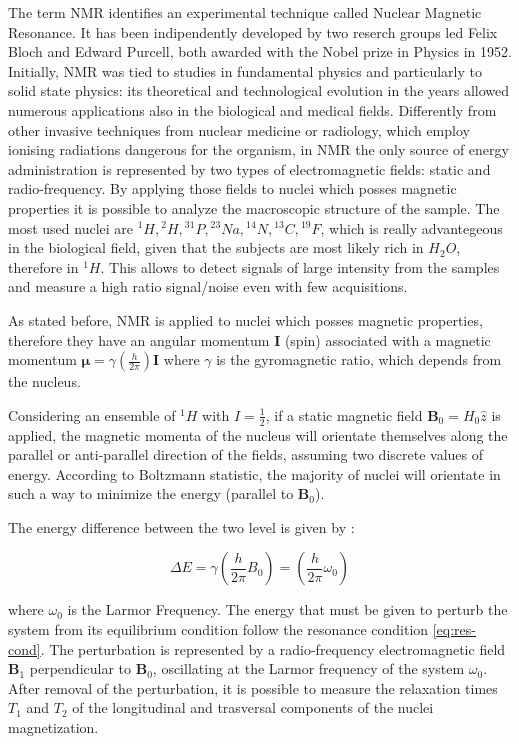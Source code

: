 \documentclass[12pt,a4paper]{report}
\begin{document}
The term NMR identifies an experimental technique called Nuclear Magnetic Resonance.
It has been indipendently developed by two reserch groups led Felix Bloch and Edward Purcell, both awarded with the Nobel prize in Physics in 1952. 
Initially, NMR was tied to studies in fundamental physics and particularly to solid state physics: its theoretical and technological evolution in the years allowed numerous applications also in the biological and medical fields.    
Differently from other invasive techniques from nuclear medicine or radiology, which employ ionising radiations dangerous for the organism, in NMR the only source of energy administration is represented by two types of electromagnetic fields: static and radio-frequency.
By applying those fields to nuclei which posses magnetic properties it is possible to analyze the macroscopic structure of the sample. 
The most used nuclei are ${}^1H, {}^2H, {}^{31}P, {}^{23}Na, {}^{14}N, {}^{13}C, {}^{19}F$, which is really advantegeous in the biological field, given that the subjects are most likely rich in $H_2O$, therefore in ${}^1H$. 
This allows to detect signals of large intensity from the samples and measure a high ratio signal/noise even with few acquisitions.

As stated before, NMR is applied to nuclei which posses magnetic properties, therefore they have an angular momentum $\bm{I}$ (spin) associated with a magnetic momentum $\bm{\mu} = \gamma(\frac{h}{2\pi})\bm{I}$ where $\gamma$ is the gyromagnetic ratio, which depends from the nucleus.

Considering an ensemble of ${}^1H$ with $I = \frac{1}{2}$, if a static magnetic field $\bm{B}_0 = H_0 \hat z$ is applied, the magnetic momenta of the nucleus will orientate themselves along the parallel or anti-parallel direction of the fields, assuming two discrete values of energy. 
According to Boltzmann statistic, the majority of nuclei will orientate in such a way to minimize the energy (parallel to $\bm{B}_0$).

The energy difference between the two level is given by : 

\begin{equation}
 \Delta E = \gamma \left(\frac{h}{2\pi}B_0\right) = \left(\frac{h}{2\pi}\omega_0\right)
 \label{eq:res-cond}
\end{equation}

where $\omega_0$ is the Larmor Frequency.
The energy that must be given to perturb the system from its equilibrium condition follow the resonance condition \ref{eq:res-cond}. 
The perturbation is represented by a radio-frequency electromagnetic field $\bm{B}_1$ perpendicular to $\bm{B}_0$, oscillating at the Larmor frequency of the system $\omega_0$.
After removal of the perturbation, it is possible to measure the relaxation times $T_1$ and $T_2$ of the longitudinal and trasversal components of the nuclei magnetization. 
\end{document}
